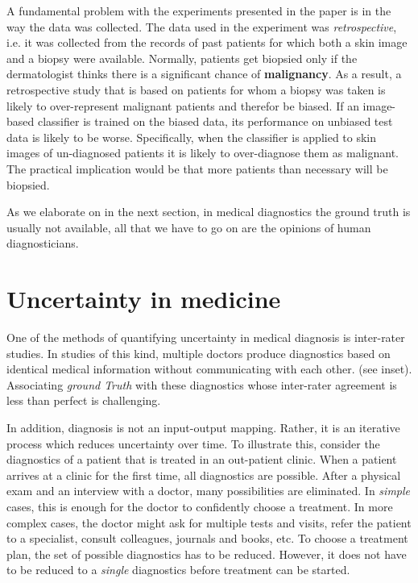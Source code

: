 \documentclass[11pt]{pnas-new}
\begin{document}
A fundamental problem with the experiments presented in the paper is in the way the data was
collected. The data used in the experiment was {\em retrospective},
i.e. it was collected from the records of past patients for which both
a skin image and a biopsy were available. Normally, patients get
biopsied only if the dermatologist thinks there is a significant
chance of {\bf malignancy}. As a result, a retrospective study that is
based on patients for whom a biopsy was taken is likely to
over-represent malignant patients and therefor be biased. If an image-based classifier
is trained on the biased data, its performance on unbiased test data
is likely to be worse. Specifically, when the classifier is applied to skin
images of un-diagnosed patients it is likely to over-diagnose them as
malignant. The practical implication would be that more patients than
necessary will be biopsied. 

As we elaborate on in the next section, in medical diagnostics the
ground truth is usually not available, all that we have to go on are
the opinions of human diagnosticians.

\section{Uncertainty in medicine}


One of the methods of quantifying uncertainty in medical diagnosis is inter-rater studies.
In studies of this kind, multiple doctors produce diagnostics
based on identical medical information without communicating with each other. (see inset).
Associating {\em ground Truth} with these diagnostics whose inter-rater agreement is less than perfect is challenging.
 
 

 
In addition, diagnosis is not an
input-output mapping. Rather, it is an iterative process which reduces
uncertainty over time. To illustrate this, consider the diagnostics of
a patient that is treated in an out-patient clinic.  When a patient
arrives at a clinic for the first time, all diagnostics are
possible. After a physical exam and an interview with a doctor, many
possibilities are eliminated. In {\em simple} cases, this is enough
for the doctor to confidently choose a treatment. In more complex
cases, the doctor might ask for multiple tests and visits, refer the
patient to a specialist, consult colleagues, journals and books,
etc. To choose a treatment plan, the set of possible diagnostics has
to be reduced.  However, it does not have to be reduced to a {\em
  single} diagnostics before treatment can be started.
\end{document}
